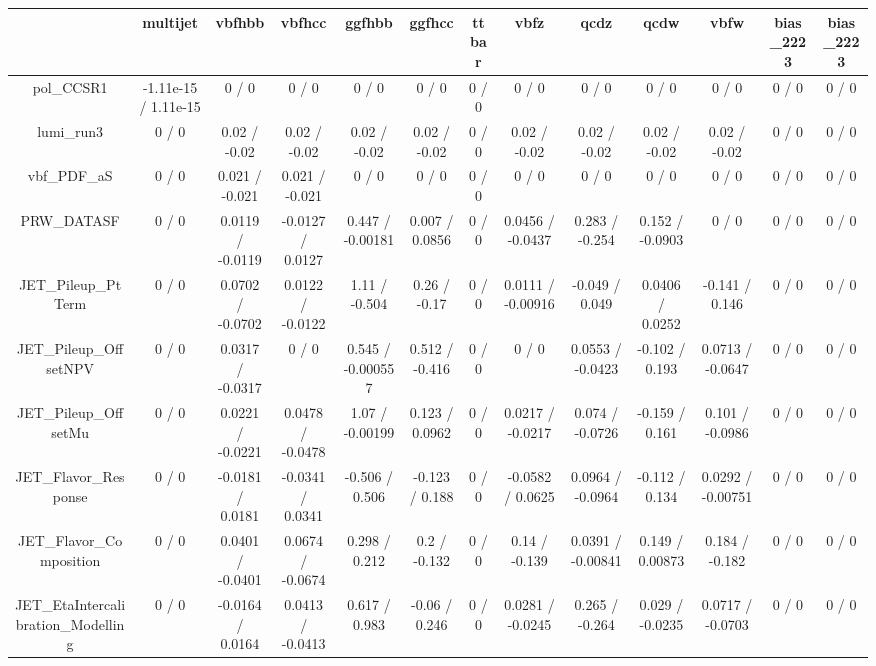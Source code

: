\documentclass[10pt]{article}
\begin{document}
\begin{table}[htbp]
\begin{center}
\begin{tabular}{|c|c|c|c|c|c|c|c|c|c|c|c|c|}
\hline 
      & multijet      & vbfhbb      & vbfhcc      & ggfhbb      & ggfhcc      & ttbar      & vbfz      & qcdz      & qcdw      & vbfw      & bias_2223      & bias_2223 \\ 
\hline 
  pol_CCSR1 & -1.11e-15 / 1.11e-15 & 0 / 0 & 0 / 0 & 0 / 0 & 0 / 0 & 0 / 0 & 0 / 0 & 0 / 0 & 0 / 0 & 0 / 0 & 0 / 0 & 0 / 0 \\ 
  lumi_run3 & 0 / 0 & 0.02 / -0.02 & 0.02 / -0.02 & 0.02 / -0.02 & 0.02 / -0.02 & 0 / 0 & 0.02 / -0.02 & 0.02 / -0.02 & 0.02 / -0.02 & 0.02 / -0.02 & 0 / 0 & 0 / 0 \\ 
  vbf_PDF_aS & 0 / 0 & 0.021 / -0.021 & 0.021 / -0.021 & 0 / 0 & 0 / 0 & 0 / 0 & 0 / 0 & 0 / 0 & 0 / 0 & 0 / 0 & 0 / 0 & 0 / 0 \\ 
  PRW_DATASF & 0 / 0 & 0.0119 / -0.0119 & -0.0127 / 0.0127 & 0.447 / -0.00181 & 0.007 / 0.0856 & 0 / 0 & 0.0456 / -0.0437 & 0.283 / -0.254 & 0.152 / -0.0903 & 0 / 0 & 0 / 0 & 0 / 0 \\ 
  JET_Pileup_PtTerm & 0 / 0 & 0.0702 / -0.0702 & 0.0122 / -0.0122 & 1.11 / -0.504 & 0.26 / -0.17 & 0 / 0 & 0.0111 / -0.00916 & -0.049 / 0.049 & 0.0406 / 0.0252 & -0.141 / 0.146 & 0 / 0 & 0 / 0 \\ 
  JET_Pileup_OffsetNPV & 0 / 0 & 0.0317 / -0.0317 & 0 / 0 & 0.545 / -0.000557 & 0.512 / -0.416 & 0 / 0 & 0 / 0 & 0.0553 / -0.0423 & -0.102 / 0.193 & 0.0713 / -0.0647 & 0 / 0 & 0 / 0 \\ 
  JET_Pileup_OffsetMu & 0 / 0 & 0.0221 / -0.0221 & 0.0478 / -0.0478 & 1.07 / -0.00199 & 0.123 / 0.0962 & 0 / 0 & 0.0217 / -0.0217 & 0.074 / -0.0726 & -0.159 / 0.161 & 0.101 / -0.0986 & 0 / 0 & 0 / 0 \\ 
  JET_Flavor_Response & 0 / 0 & -0.0181 / 0.0181 & -0.0341 / 0.0341 & -0.506 / 0.506 & -0.123 / 0.188 & 0 / 0 & -0.0582 / 0.0625 & 0.0964 / -0.0964 & -0.112 / 0.134 & 0.0292 / -0.00751 & 0 / 0 & 0 / 0 \\ 
  JET_Flavor_Composition & 0 / 0 & 0.0401 / -0.0401 & 0.0674 / -0.0674 & 0.298 / 0.212 & 0.2 / -0.132 & 0 / 0 & 0.14 / -0.139 & 0.0391 / -0.00841 & 0.149 / 0.00873 & 0.184 / -0.182 & 0 / 0 & 0 / 0 \\ 
  JET_EtaIntercalibration_Modelling & 0 / 0 & -0.0164 / 0.0164 & 0.0413 / -0.0413 & 0.617 / 0.983 & -0.06 / 0.246 & 0 / 0 & 0.0281 / -0.0245 & 0.265 / -0.264 & 0.029 / -0.0235 & 0.0717 / -0.0703 & 0 / 0 & 0 / 0 \\ 

\end{tabular}
\end{center}
\end{table}
\end{document}
